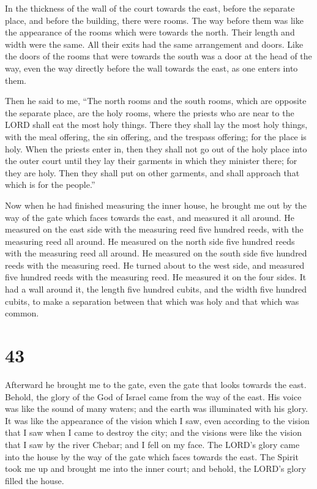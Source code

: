  In the thickness of the wall of the court towards the
east, before the separate place, and before the building, there were
rooms.  The way before them was like the appearance of
the rooms which were towards the north. Their length and width were the
same. All their exits had the same arrangement and doors.
 Like the doors of the rooms that were towards the south
was a door at the head of the way, even the way directly before the wall
towards the east, as one enters into them.

 Then he said to me, ``The north rooms and the south
rooms, which are opposite the separate place, are the holy rooms, where
the priests who are near to the LORD shall eat the most holy things.
There they shall lay the most holy things, with the meal offering, the
sin offering, and the trespass offering; for the place is holy.
 When the priests enter in, then they shall not go out of
the holy place into the outer court until they lay their garments in
which they minister there; for they are holy. Then they shall put on
other garments, and shall approach that which is for the people.''

 Now when he had finished measuring the inner house, he
brought me out by the way of the gate which faces towards the east, and
measured it all around.  He measured on the east side
with the measuring reed five hundred reeds, with the measuring reed all
around.  He measured on the north side five hundred reeds
with the measuring reed all around.  He measured on the
south side five hundred reeds with the measuring reed. 
He turned about to the west side, and measured five hundred reeds with
the measuring reed.  He measured it on the four sides. It
had a wall around it, the length five hundred cubits, and the width five
hundred cubits, to make a separation between that which was holy and
that which was common.

\hypertarget{section-41}{%
\section{43}\label{section-41}}

 Afterward he brought me to the gate, even the gate that
looks towards the east.  Behold, the glory of the God of
Israel came from the way of the east. His voice was like the sound of
many waters; and the earth was illuminated with his glory.
 It was like the appearance of the vision which I saw,
even according to the vision that I saw when I came to destroy the city;
and the visions were like the vision that I saw by the river Chebar; and
I fell on my face.  The LORD's glory came into the house
by the way of the gate which faces towards the east.  The
Spirit took me up and brought me into the inner court; and behold, the
LORD's glory filled the house.

